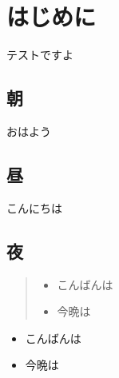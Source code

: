 \documentclass[draft]{jsarticle}
\begin{document}
\tableofcontents
\pagebreak %
\section{はじめに}
テストですよ
\subsection{朝}
おはよう
\subsection{昼}
こんにちは
\subsection{夜}
\begin{quote} %
    \begin{itemize} %
        \item こんばんは
        \item 今晩は
    \end{itemize} %
\end{quote} %
\begin{itemize}
    \item こんばんは
    \\ %
    \item 今晩は
\end{itemize}

\begin{appendix}

\end{appendix}
\end{document}
